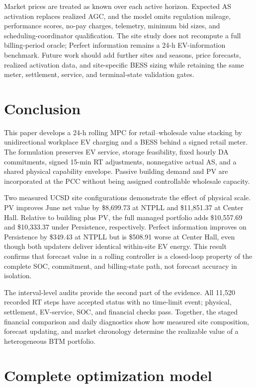 \documentclass[final,5p,times]{elsarticle}
\begin{document}
Market prices are treated as known over each active horizon. Expected AS
activation replaces realized AGC, and the model omits regulation mileage,
performance scores, no-pay charges, telemetry, minimum bid sizes, and
scheduling-coordinator qualification. The site study does not recompute a full
billing-period oracle; Perfect information remains a 24-h EV-information
benchmark. Future work should add further sites and seasons, price forecasts,
realized activation data, and site-specific BESS sizing while retaining the
same meter, settlement, service, and terminal-state validation gates.

\section{Conclusion}
\label{sec:conclusion}

This paper develops a 24-h rolling MPC for retail--wholesale value stacking by
unidirectional workplace EV charging and a BESS behind a signed retail meter.
The formulation preserves EV service, storage feasibility, fixed hourly DA
commitments, signed 15-min RT adjustments, nonnegative actual AS, and a shared
physical capability envelope. Passive building demand and PV are incorporated
at the PCC without being assigned controllable wholesale capacity.

Two measured UCSD site configurations demonstrate the effect of physical
scale. PV improves June net value by \$8,699.73 at NTPLL and \$11,851.37 at
Center Hall. Relative to building plus PV, the full managed portfolio adds
\$10,557.69 and \$10,333.37 under Persistence, respectively. Perfect
information improves on Persistence by \$349.43 at NTPLL but is \$508.91 worse
at Center Hall, even though both updaters deliver identical within-site EV
energy. This result confirms that forecast value in a rolling controller is a
closed-loop property of the complete SOC, commitment, and billing-state path,
not forecast accuracy in isolation.

The interval-level audits provide the second part of the evidence. All 11,520
recorded RT steps have accepted status with no time-limit event; physical,
settlement, EV-service, SOC, and financial checks pass. Together, the staged
financial comparison and daily diagnostics show how measured site composition,
forecast updating, and market chronology determine the realizable value of a
heterogeneous BTM portfolio.

\appendix

\section{Complete optimization model}
\label{app:complete_model}
\end{document}
